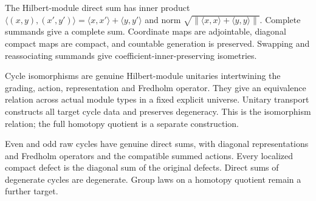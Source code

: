 \begin{proposition}\label{prop:hilbert-module-direct-sum}
\leanok
The Hilbert-module direct sum has inner product
$\langle(x,y),(x',y')\rangle=\langle x,x'\rangle+\langle y,y'\rangle$
and norm $\sqrt{\|\langle x,x\rangle+\langle y,y\rangle\|}$.
Complete summands give a complete sum. Coordinate maps are adjointable,
diagonal compact maps are compact, and countable generation is preserved.
Swapping and reassociating summands give coefficient-inner-preserving
isometries.
\end{proposition}

\begin{definition}\label{def:kasparov-cycle-unitary-isomorphism}
\leanok
Cycle isomorphisms are genuine Hilbert-module unitaries intertwining the
grading, action, representation and Fredholm operator. They give an
equivalence relation across actual module types in a fixed explicit universe.
Unitary transport constructs all target cycle data and preserves degeneracy.
This is the isomorphism relation; the full homotopy quotient is a separate
construction.
\end{definition}

\begin{proposition}\label{prop:kasparov-cycle-direct-sum}
\leanok
Even and odd raw cycles have genuine direct sums, with diagonal
representations and Fredholm operators and the compatible summed actions.
Every localized compact defect is the diagonal sum of the original defects.
Direct sums of degenerate cycles are degenerate. Group laws on a homotopy
quotient remain a further target.
\end{proposition}

